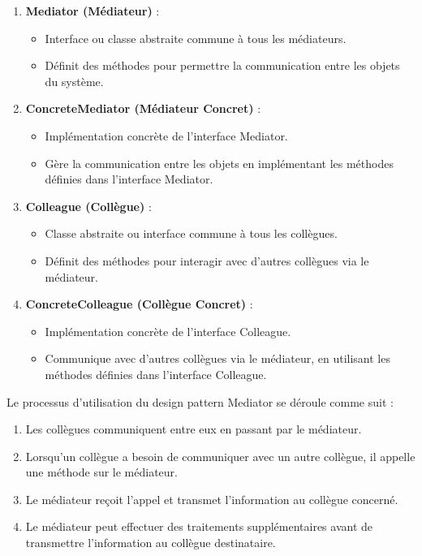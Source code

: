 \begin{enumerate}[leftmargin=*,labelsep=3mm]
    \item \textbf{Mediator (Médiateur)} :
    \begin{itemize}
        \item Interface ou classe abstraite commune à tous les médiateurs.
        \item Définit des méthodes pour permettre la communication entre les objets du système.
    \end{itemize}
    
    \item \textbf{ConcreteMediator (Médiateur Concret)} :
    \begin{itemize}
        \item Implémentation concrète de l'interface Mediator.
        \item Gère la communication entre les objets en implémentant les méthodes définies dans l'interface Mediator.
    \end{itemize}
    
    \item \textbf{Colleague (Collègue)} :
    \begin{itemize}
        \item Classe abstraite ou interface commune à tous les collègues.
        \item Définit des méthodes pour interagir avec d'autres collègues via le médiateur.
    \end{itemize}
    
    \item \textbf{ConcreteColleague (Collègue Concret)} :
    \begin{itemize}
        \item Implémentation concrète de l'interface Colleague.
        \item Communique avec d'autres collègues via le médiateur, en utilisant les méthodes définies dans l'interface Colleague.
    \end{itemize}
\end{enumerate}

Le processus d'utilisation du design pattern Mediator se déroule comme suit :

\begin{enumerate}[leftmargin=*,labelsep=3mm]
    \item Les collègues communiquent entre eux en passant par le médiateur.
    \item Lorsqu'un collègue a besoin de communiquer avec un autre collègue, il appelle une méthode sur le médiateur.
    \item Le médiateur reçoit l'appel et transmet l'information au collègue concerné.
    \item Le médiateur peut effectuer des traitements supplémentaires avant de transmettre l'information au collègue destinataire.
\end{enumerate}

